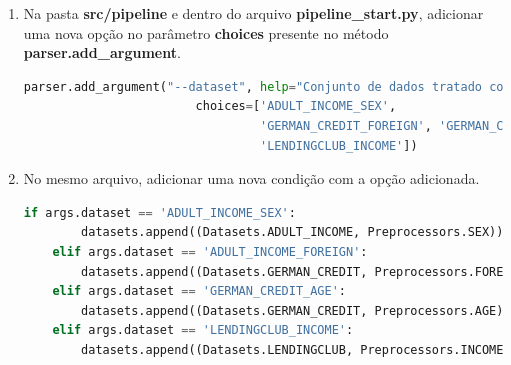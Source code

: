 \documentclass[portugues]{ic-tese}
\begin{document}
\begin{enumerate}
\begin{lstlisting}[language=Python, label=cod:PipelinePreprocessors]
    def select_data_preprocessor(self, dataset, preprocessor):
        choice = [dataset, preprocessor]
        options = [
            ([Datasets.ADULT_INCOME, Preprocessors.SEX], (AdultDataset(), AdultSexPreprocessor(), AdultSexFairnessPipe())),
            ([Datasets.GERMAN_CREDIT, Preprocessors.AGE], (GermanDataset(), GermanAgePreprocessor(), GermanAgeFairnessPipe())),
            ([Datasets.GERMAN_CREDIT, Preprocessors.FOREIGN], (GermanDataset(), GermanForeignPreprocessor(), GermanForeignFairnessPipe())),
            ([Datasets.LENDINGCLUB, Preprocessors.INCOME], (LendingclubDataset(), LendingclubIncomePreprocessor(), LendingclubIncomeFairnessPipe())),
        ]

        for option, pipe_filter in options:
            if choice == option:
                dataset_pipe, data_preprocessor_filter, fairness_pipe = pipe_filter
                preprocessed_data_pipe = dataset_pipe >= data_preprocessor_filter == self.new_pipe()
                break

        return preprocessed_data_pipe, fairness_pipe
\end{lstlisting}

\item Na pasta \textbf{src/pipeline} e dentro do arquivo \textbf{pipeline\_start.py}, adicionar uma nova opção no parâmetro \textbf{choices} presente no método \textbf{parser.add\_argument}.

\begin{lstlisting}[language=Python, label=cod:ParserAddArgumentPipeline]
    parser.add_argument("--dataset", help="Conjunto de dados tratado com atributo protegido",
                        choices=['ADULT_INCOME_SEX',
                                 'GERMAN_CREDIT_FOREIGN', 'GERMAN_CREDIT_AGE',
                                 'LENDINGCLUB_INCOME'])
\end{lstlisting}

\item No mesmo arquivo, adicionar uma nova condição com a opção adicionada.

\begin{lstlisting}[language=Python, label=cod:IfPipelineStart]
    if args.dataset == 'ADULT_INCOME_SEX':
        datasets.append((Datasets.ADULT_INCOME, Preprocessors.SEX))
    elif args.dataset == 'ADULT_INCOME_FOREIGN':
        datasets.append((Datasets.GERMAN_CREDIT, Preprocessors.FOREIGN))
    elif args.dataset == 'GERMAN_CREDIT_AGE':
        datasets.append((Datasets.GERMAN_CREDIT, Preprocessors.AGE))
    elif args.dataset == 'LENDINGCLUB_INCOME':
        datasets.append((Datasets.LENDINGCLUB, Preprocessors.INCOME))]
\end{lstlisting}

\end{enumerate}
\end{document}
